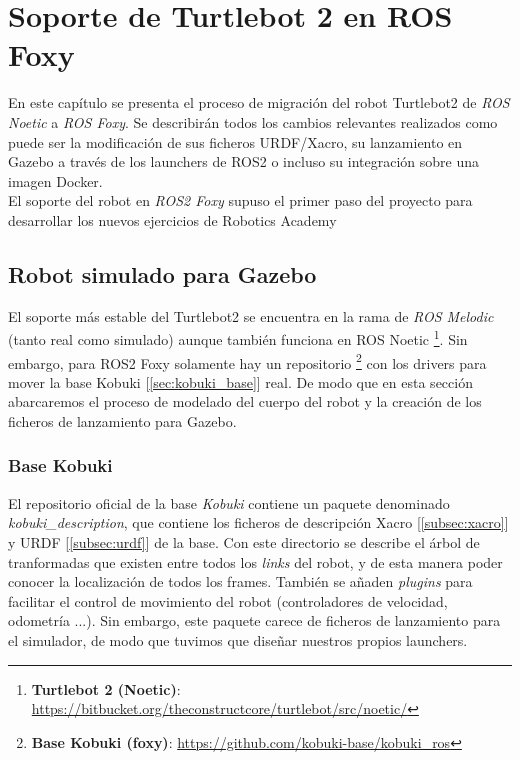 \chapter{Soporte de Turtlebot 2 en ROS Foxy}
\label{cap:capitulo4}

En este capítulo se presenta el proceso de migración del robot Turtlebot2 de \textit{ROS Noetic} a \textit{ROS Foxy}. Se describirán todos los cambios relevantes realizados como puede ser la modificación de sus ficheros URDF/Xacro, su lanzamiento en Gazebo a través de los launchers de ROS2 o incluso su integración sobre una imagen Docker.\\

El soporte del robot en \textit{ROS2 Foxy} supuso el primer paso del proyecto para desarrollar los nuevos ejercicios de Robotics Academy\\




\section{Robot simulado para Gazebo}
\label{sec:robot_simulado_gazebo}

El soporte más estable del Turtlebot2 se encuentra en la rama de \textit{ROS Melodic} (tanto real como simulado) aunque también funciona en ROS Noetic \footnote{\textbf{Turtlebot 2 (Noetic)}: \url{https://bitbucket.org/theconstructcore/turtlebot/src/noetic/}}. Sin embargo, para ROS2 Foxy solamente hay un repositorio \footnote{\textbf{Base Kobuki (foxy)}: \url{https://github.com/kobuki-base/kobuki_ros}} con los drivers para mover la base Kobuki [\ref{sec:kobuki_base}] real. De modo que en esta sección abarcaremos el proceso de modelado del cuerpo del robot y la creación de los ficheros de lanzamiento para Gazebo.\\


\subsection{Base Kobuki}
\label{subsec:kobuki_base_simulado}

El repositorio oficial de la base \textit{Kobuki} contiene un paquete denominado \textit{kobuki\_description}, que contiene los ficheros de descripción Xacro [\ref{subsec:xacro}] y URDF [\ref{subsec:urdf}] de la base. Con este directorio se describe el árbol de tranformadas que existen entre todos los \textit{links} del robot, y de esta manera poder conocer la localización de todos los frames. También se añaden \textit{plugins} para facilitar el control de movimiento del robot (controladores de velocidad, odometría ...). Sin embargo, este paquete carece de ficheros de lanzamiento para el simulador, de modo que tuvimos que diseñar nuestros propios launchers.\\

